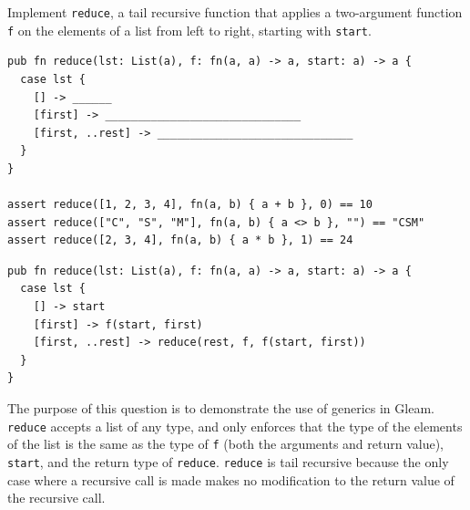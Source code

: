\begin{blocksection}
\question Implement \texttt{reduce}, a tail recursive function that applies a
two-argument function \texttt{f} on the elements of a list from left to right,
starting with \texttt{start}.
\newline
\begin{lstlisting}
pub fn reduce(lst: List(a), f: fn(a, a) -> a, start: a) -> a {
  case lst {
    [] -> ______
    [first] -> ______________________________
    [first, ..rest] -> ______________________________
  }
}

assert reduce([1, 2, 3, 4], fn(a, b) { a + b }, 0) == 10
assert reduce(["C", "S", "M"], fn(a, b) { a <> b }, "") == "CSM"
assert reduce([2, 3, 4], fn(a, b) { a * b }, 1) == 24
\end{lstlisting}
\begin{solution}
\begin{lstlisting}
pub fn reduce(lst: List(a), f: fn(a, a) -> a, start: a) -> a {
  case lst {
    [] -> start
    [first] -> f(start, first)
    [first, ..rest] -> reduce(rest, f, f(start, first))
  }
}
\end{lstlisting}
\end{solution}

\begin{questionmeta}
  The purpose of this question is to demonstrate the use of generics in Gleam. \lstinline{reduce} accepts a list of any type, and only
  enforces that the type of the elements of the list is the same as the type of \lstinline{f} (both the arguments and return value), \lstinline{start},
  and the return type of \lstinline{reduce}. \lstinline{reduce} is tail recursive because the only case where a recursive call is made makes no
  modification to the return value of the recursive call.
\end{questionmeta}
\end{blocksection}